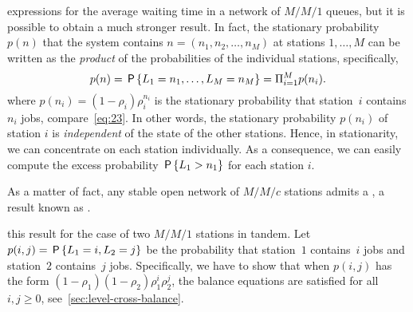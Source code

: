  expressions for the average waiting time in a network of $M/M/1$ queues, but it is possible to obtain a much stronger result.
In fact, the stationary probability $p(n)$ that the system contains $n=(n_1,n_2, \ldots, n_M)$ at stations $1,\ldots, M$ can be written as the \emph{product} of the probabilities of the individual stations, specifically,
\begin{equation*}
p(n) =  \P{\L_1=n_1, \ldots, \L_M=n_M}  = \Pi_{i=1}^M p(n_i). %
\end{equation*}
where $p(n_i)=(1-\rho_i)\rho_i^{n_i}$ is the stationary probability that station~$i$ contains $n_i$ jobs, compare~\cref{eq:23}.
In other words, the stationary probability $p(n_i)$ of station $i$ is \emph{independent} of the state of the other stations. Hence, in stationarity, we can concentrate on each station individually. As a consequence, we can easily compute the excess probability $\,\mathsf{P}\left\{L_1> n_1\right\}$ for each station $i$.

As a matter of fact, any stable open network of $M/M/c$ stations
admits a , a result known as .

 this result for the case of two $M/M/1$ stations in tandem.
Let $p(i,j)=\,\mathsf{P}\left\{L_1=i, L_2=j\right\}$ be the probability that station~$1$ contains~$i$ jobs and station~$2$ contains~$j$ jobs.
Specifically, we have to show that when $p(i,j)$ has the form $(1-\rho_1)(1-\rho_2)\rho_1^i \rho_2^j$, the balance equations are satisfied for all $i, j\geq 0$, see~\cref{sec:level-cross-balance}.



